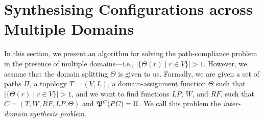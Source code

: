 \section{Synthesising Configurations across Multiple Domains}
\label{sec:synth-multi}

In this section, we present an algorithm for 
solving the path-compliance problem in the presence
of multiple domains---i.e., $|\{\Theta(r) \mid r\in V\}|>1$.
However, we assume that the domain splitting $\Theta$ is given to us.
Formally, we are given a set of paths $\Pi$,
a topology $T=(V,L)$,
a domain-assignment function $\Theta$ such that $|\{\Theta(r) \mid r\in V\}|>1$, 
and we want to find functions
$LP$, $W$, and $RF$,  such that
$C=(T,W,RF,LP,\Theta)$ and
$\mathfrak{P}^C(PC) = \Pi$.
We call this problem the \emph{inter-domain synthesis problem}.

\begin{figure}
	\centering
	\hfill
	\hfill
\end{figure}

